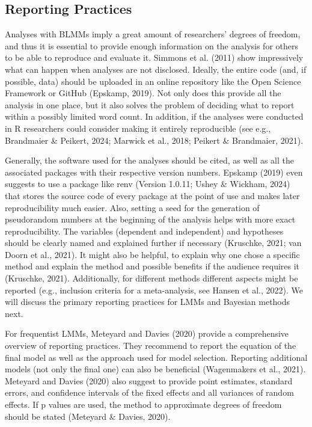 \documentclass[
  doc,12pt,floatsintext]{apa7}
\begin{document}
\subsection{Reporting Practices}\label{reporting-practices}

Analyses with BLMMs imply a great amount of researchers' degrees of freedom, and thus it is essential to provide enough information on the analysis for others to be able to reproduce and evaluate it. Simmons et al. (2011) show impressively what can happen when analyses are not disclosed. Ideally, the entire code (and, if possible, data) should be uploaded in an online repository like the Open Science Framework or GitHub (Epskamp, 2019). Not only does this provide all the analysis in one place, but it also solves the problem of deciding what to report within a possibly limited word count. In addition, if the analyses were conducted in R researchers could consider making it entirely reproducible (see e.g., Brandmaier \& Peikert, 2024; Marwick et al., 2018; Peikert \& Brandmaier, 2021).

Generally, the software used for the analyses should be cited, as well as all the associated packages with their respective version numbers. Epskamp (2019) even suggests to use a package like renv (Version 1.0.11; Ushey \& Wickham, 2024) that stores the source code of every package at the point of use and makes later reproducibility much easier. Also, setting a seed for the generation of pseudorandom numbers at the beginning of the analysis helps with more exact reproducibility. The variables (dependent and independent) and hypotheses should be clearly named and explained further if necessary (Kruschke, 2021; van Doorn et al., 2021). It might also be helpful, to explain why one chose a specific method and explain the method and possible benefits if the audience requires it (Kruschke, 2021). Additionally, for different methods different aspects might be reported (e.g., inclusion criteria for a meta-analysis, see Hansen et al., 2022). We will discuss the primary reporting practices for LMMs and Bayesian methods next.

For frequentist LMMs, Meteyard and Davies (2020) provide a comprehensive overview of reporting practices. They recommend to report the equation of the final model as well as the approach used for model selection. Reporting additional models (not only the final one) can also be beneficial (Wagenmakers et al., 2021). Meteyard and Davies (2020) also suggest to provide point estimates, standard errors, and confidence intervals of the fixed effects and all variances of random effects. If p values are used, the method to approximate degrees of freedom should be stated (Meteyard \& Davies, 2020).
\end{document}
